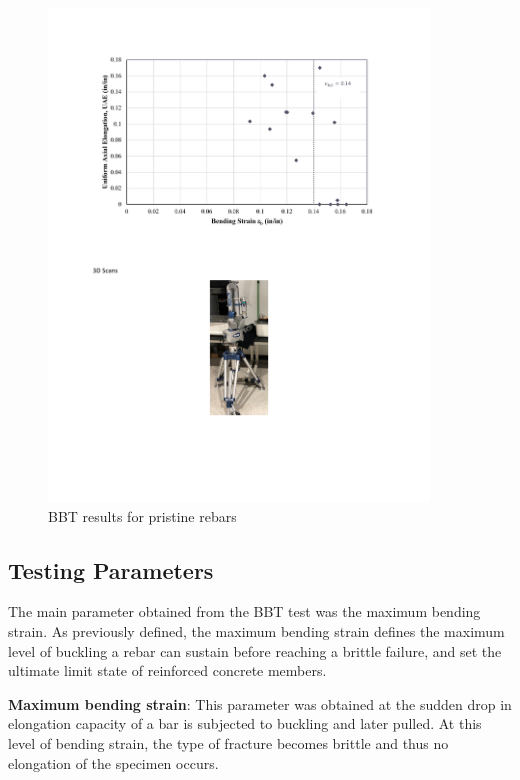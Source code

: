 \begin{figure}[htbp]
    \centering
    \includegraphics[width=0.9\textwidth]{VAC Thesis 2.0/Chapter-3/figs/bbt_bendinstrain_cl0.pdf}
    \caption{BBT results for pristine rebars \cite{Barcley2018}}
    \label{fig:BBT_MaxBendingStrain}
\end{figure}

\newpage

\subsection{Testing Parameters}

The main parameter obtained from the BBT test was the maximum bending strain. As previously defined, the maximum bending strain defines the maximum level of buckling a rebar can sustain before reaching a brittle failure, and set the ultimate limit state of reinforced concrete members.

\textbf{Maximum bending strain}: This parameter was obtained at the sudden drop in elongation capacity of a bar is subjected to buckling and later pulled. At  this level of bending strain, the type of fracture becomes brittle and thus no elongation of the specimen occurs.


